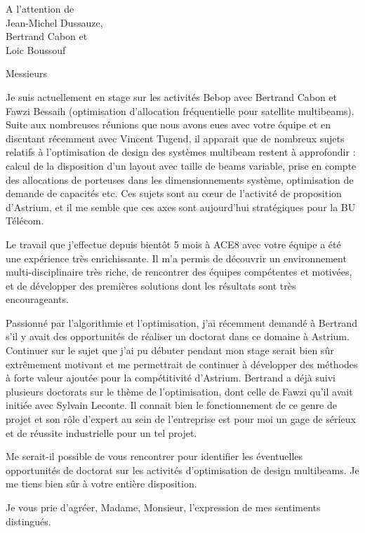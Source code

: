\documentclass[12pt]{lettre}
\begin{document}
\begin{letter}{A l'attention de\\Jean-Michel Dussauze,\\Bertrand Cabon et\\ Loic Boussouf}
\address{Victor Cameo Ponz\\47 rue Guynemer\\31200 Toulouse}
\nofax

\opening{Messieurs}
Je suis actuellement en stage sur les activités Bebop avec Bertrand Cabon et Fawzi Bessaih
(optimisation d’allocation fréquentielle pour satellite multibeams).
Suite aux nombreuses réunions que nous avons eues avec votre équipe et en
discutant récemment avec Vincent Tugend,
il apparait que de nombreux sujets relatifs à l’optimisation de design des systèmes
multibeam restent à approfondir : calcul de la disposition d’un layout avec taille de beams variable,
prise en compte des allocations de porteuses dans les dimensionnements système,
optimisation de demande de capacités etc.
Ces sujets sont au cœur de l’activité de proposition d’Astrium,
et il me semble que ces axes sont aujourd’hui stratégiques pour la BU Télécom.

Le travail que j’effectue depuis bientôt 5 mois à ACE8 avec votre équipe a été une expérience très enrichissante. Il m’a permis de découvrir un environnement multi-disciplinaire très riche, de rencontrer des équipes compétentes et motivées, et de développer des premières solutions dont les résultats sont très encourageants.

Passionné par l’algorithmie et l’optimisation, j’ai récemment demandé à Bertrand s’il y avait des opportunités de réaliser un doctorat dans ce domaine à Astrium. Continuer sur le sujet que j’ai pu débuter pendant mon stage serait bien sûr extrêmement motivant et me permettrait de continuer à développer des méthodes à forte valeur ajoutée pour la compétitivité d’Astrium. Bertrand a déjà suivi plusieurs doctorats sur le thème de l’optimisation, dont celle de Fawzi qu’il avait initiée avec Sylvain Leconte. Il connait bien le fonctionnement de ce genre de projet et son rôle d’expert au sein de l’entreprise est pour moi un gage de sérieux et de réussite industrielle pour un tel projet.

Me serait-il possible de vous rencontrer pour identifier les éventuelles opportunités de doctorat sur les activités d’optimisation de design multibeams. Je me tiens bien sûr à votre entière disposition.

\closing{Je vous prie d'agréer, Madame, Monsieur, l'expression de mes sentiments distingués.}
\end{letter}
\end{document}
